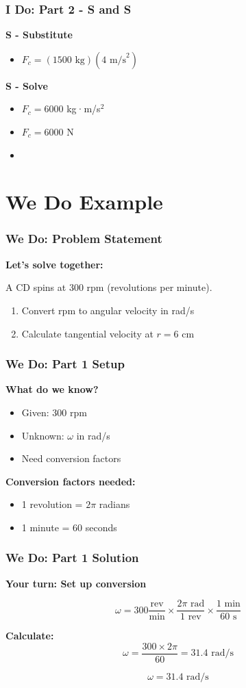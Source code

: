 \documentclass{beamer}
\begin{document}
\begin{frame}
\frametitle{I Do: Part 2 - S and S}
\textbf{S - Substitute}
\begin{itemize}
    \item $F_c = (1500 \text{ kg})(4 \text{ m/s}^2)$
\end{itemize}

\textbf{S - Solve}
\begin{itemize}
    \item $F_c = 6000$ kg·m/s$^2$
    \item $F_c = 6000$ N
    \item {}
\end{itemize}
\end{frame}

\section{We Do Example}

\begin{frame}
\frametitle{We Do: Problem Statement}
\textbf{Let's solve together:}

A CD spins at 300 rpm (revolutions per minute).
\begin{enumerate}
    \item Convert rpm to angular velocity in rad/s
    \item Calculate tangential velocity at $r = 6$ cm
\end{enumerate}
\end{frame}

\begin{frame}
\frametitle{We Do: Part 1 Setup}
\textbf{What do we know?}
\pause
\begin{itemize}
    \item Given: 300 rpm
    \pause
    \item Unknown: $\omega$ in rad/s
    \pause
    \item Need conversion factors
\end{itemize}
\pause

\textbf{Conversion factors needed:}
\begin{itemize}
    \item 1 revolution = $2\pi$ radians
    \item 1 minute = 60 seconds
\end{itemize}
\end{frame}

\begin{frame}
\frametitle{We Do: Part 1 Solution}
\textbf{Your turn: Set up conversion}
\pause

\[ \omega = 300 \frac{\text{rev}}{\text{min}} \times \frac{2\pi \text{ rad}}{1 \text{ rev}} \times \frac{1 \text{ min}}{60 \text{ s}} \]
\pause

\textbf{Calculate:}
\[ \omega = \frac{300 \times 2\pi}{60} = 31.4 \text{ rad/s} \]
\pause

\[\boxed{\omega = 31.4 \text{ rad/s}}\]
\end{frame}
\end{document}
